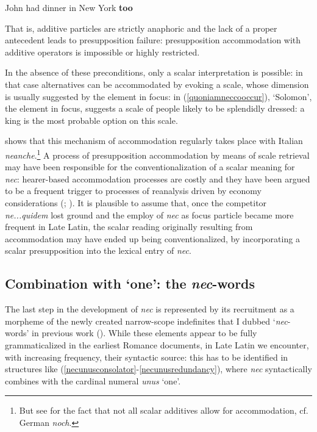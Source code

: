 \documentclass[output=paper,modfonts,nonflat,citecolor=brown,
showindex
]{langsci/langscibook}
\begin{document}
{\begin{exe}
\ex {}  John had dinner in New York {\textbf{too}}
\end{exe}}

\noindent That is, additive particles are strictly anaphoric and the lack of a proper antecedent leads to presupposition failure: presupposition accommodation with additive operators is impossible or highly restricted.

In the absence of these preconditions, only a scalar interpretation is possible: in that case alternatives can be accommodated by evoking a scale, whose dimension is usually suggested by the element in focus: in (\ref{quoniamneccooccur}), `Solomon', the element in focus, suggests a scale of people likely to be splendidly dressed: a king is the most probable option on this scale.

\citet{Tovena06} shows that this mechanism of accommodation regularly takes place with Italian {\emph{neanche}}.{\footnote{But see \citet{Umbach12} for the fact that not all scalar additives allow for accommodation, cf. German {\emph{noch}}.}} A process of presupposition accommodation by means of scale retrieval may have been responsible for the conventionalization of a scalar meaning for {\emph{nec}}: hearer-based accommodation processes are costly and they have been argued to be a frequent trigger to processes of reanalysis driven by economy considerations (\citealt[]{TraugottDasher02, Eckardt06}; \citealt[]{SchwenterWaltereit10}). It is plausible to assume that, once the competitor {\emph{ne...quidem}} lost ground and the employ of {\emph{nec}} as focus particle became more frequent in Late Latin, the scalar reading originally resulting from accommodation may have ended up being conventionalized, by incorporating a scalar presupposition into the lexical entry of {\emph{nec}}.

\subsection{Combination with `one': the {\emph{nec}}-words} \label{necwordssection}

The last step in the development of {\emph{nec}} is represented by its recruitment as a morpheme of the newly created narrow-scope indefinites that I dubbed `{\emph{nec}}-words' in previous work (\citealt[chapter 5]{Gianollo18}). While these elements appear to be fully grammaticalized in the earliest Romance documents, in Late Latin we encounter, with increasing frequency, their syntactic source: this has to be identified in structures like (\ref{necunusconsolator}-\ref{necunusredundancy}), where {\emph{nec}} syntactically combines with the cardinal numeral {\emph{unus}} `one'.
\end{document}
